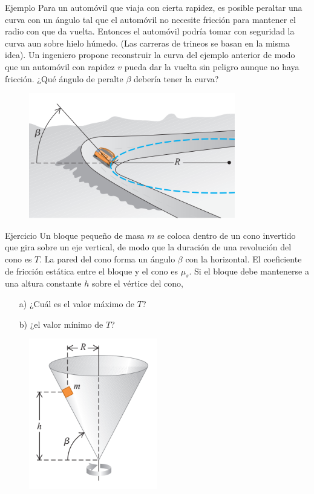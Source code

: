 \begin{frame}{Ejemplo}
    Para un automóvil que viaja con cierta rapidez, es posible peraltar una curva con un ángulo tal que el automóvil no necesite fricción para mantener el radio con que da vuelta. Entonces el automóvil podría tomar con seguridad la curva aun sobre hielo húmedo. (Las carreras de trineos se basan en la misma idea). Un ingeniero propone reconstruir la curva
del ejemplo anterior de modo que un automóvil con rapidez $v$ pueda dar la
vuelta sin peligro aunque no haya fricción. ¿Qué ángulo
de peralte $\beta$ debería tener la curva?

\begin{figure}
    \centering
    \includegraphics[width=0.45\linewidth]{figures/con-peralte.png}
\end{figure}

\end{frame}

\begin{frame}{Ejercicio}
    Un bloque pequeño de masa $m$ se coloca dentro de un cono invertido que gira sobre un eje vertical, de modo que la duración de una revolución del cono es $T$. La pared del cono forma un ángulo $\beta$ con la horizontal. El coeficiente de fricción estática entre el bloque y el cono es $\mu_s$. Si el bloque debe mantenerse a una altura constante $h$ sobre el vértice del cono,
    \begin{itemize}
        \item[a)] ¿Cuál es el valor máximo de $T$?
        \item[b)] ¿el valor mínimo de $T$?
    \end{itemize}

    \begin{figure}
        \centering
        \includegraphics[width=0.35\linewidth]{figures/cono-rev.png}
    \end{figure}
    
\end{frame}

